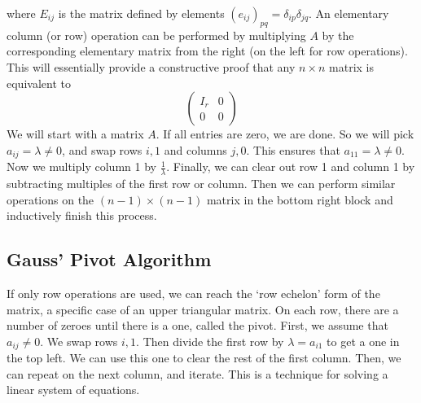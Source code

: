 where \( E_{ij} \) is the matrix defined by elements \( (e_{ij})_{pq} = \delta_{ip} \delta_{jq} \).
An elementary column (or row) operation can be performed by multiplying \( A \) by the corresponding elementary matrix from the right (on the left for row operations).
This will essentially provide a constructive proof that any \( n \times n \) matrix is equivalent to
\[ \begin{pmatrix} I_r & 0 \\ 0 & 0 \end{pmatrix} \]
We will start with a matrix \( A \).
If all entries are zero, we are done.
So we will pick \( a_{ij} = \lambda \neq 0 \), and swap rows \( i,1 \) and columns \( j,0 \).
This ensures that \( a_{11} = \lambda \neq 0 \).
Now we multiply column 1 by \( \frac{1}{\lambda} \).
Finally, we can clear out row 1 and column 1 by subtracting multiples of the first row or column.
Then we can perform similar operations on the \( (n-1)\times(n-1) \) matrix in the bottom right block and inductively finish this process.

\subsection{Gauss' Pivot Algorithm}
If only row operations are used, we can reach the `row echelon' form of the matrix, a specific case of an upper triangular matrix.
On each row, there are a number of zeroes until there is a one, called the pivot.
First, we assume that \( a_{ij} \neq 0 \).
We swap rows \( i, 1 \).
Then divide the first row by \( \lambda = a_{i1} \) to get a one in the top left.
We can use this one to clear the rest of the first column.
Then, we can repeat on the next column, and iterate.
This is a technique for solving a linear system of equations.

